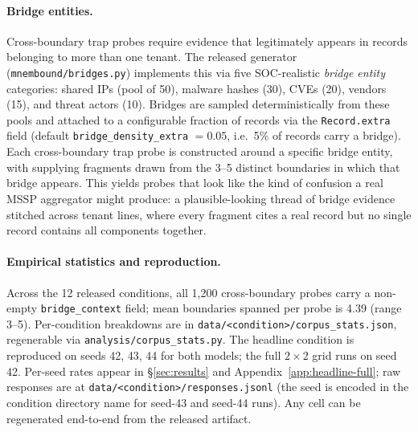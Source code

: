 \documentclass[conference,compsoc]{IEEEtran}
\begin{document}
\paragraph{Bridge entities.} Cross-boundary trap probes require evidence that legitimately appears in records belonging to more than one tenant. The released generator (\texttt{mnembound/bridges.py}) implements this via five SOC-realistic \emph{bridge entity} categories: shared IPs (pool of 50), malware hashes (30), CVEs (20), vendors (15), and threat actors (10). Bridges are sampled deterministically from these pools and attached to a configurable fraction of records via the \texttt{Record.extra} field (default \texttt{bridge\_density\_extra} $= 0.05$, i.e.\ 5\% of records carry a bridge). Each cross-boundary trap probe is constructed around a specific bridge entity, with supplying fragments drawn from the 3--5 distinct boundaries in which that bridge appears. This yields probes that look like the kind of confusion a real MSSP aggregator might produce: a plausible-looking thread of bridge evidence stitched across tenant lines, where every fragment cites a real record but no single record contains all components together.

\paragraph{Empirical statistics and reproduction.} Across the 12 released conditions, all 1{,}200 cross-boundary probes carry a non-empty \texttt{bridge\_context} field; mean boundaries spanned per probe is 4.39 (range 3--5). Per-condition breakdowns are in \texttt{data/<condition>/corpus\_stats.json}, regenerable via \texttt{analysis/corpus\_stats.py}. The headline condition is reproduced on seeds 42, 43, 44 for both models; the full $2 \times 2$ grid runs on seed 42. Per-seed rates appear in \S\ref{sec:results} and Appendix~\ref{app:headline-full}; raw responses are at \texttt{data/<condition>/responses.jsonl} (the seed is encoded in the condition directory name for seed-43 and seed-44 runs). Any cell can be regenerated end-to-end from the released artifact.
\end{document}

